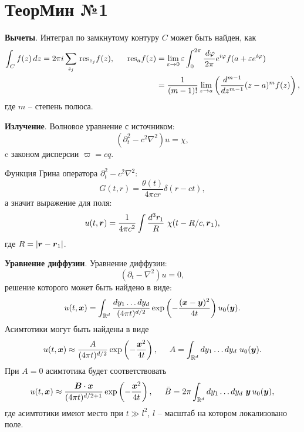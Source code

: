 \section*{ТеорМин №1}

\textbf{Вычеты}. Интеграл по замкнутому контуру $C$ может быть найден, как
\begin{align*}
    \int_C f(z) \, d z = 2 \pi i \sum_{z_j} \,\text{res}_{z_j} f(z),
    \hspace{5 mm} 
    \,\text{res}_{a} f(z) &= \lim_{\varepsilon \to 0} \varepsilon \int_0^{2\pi} \frac{\, d \varphi}{2\pi} e^{i \varphi} f(a + \varepsilon e^{i \varphi}) \\ 
    &= \frac{1}{(m-1)!} \lim_{z \to a} \left(
        \frac{d^{m-1} }{d z^{m-1}} (z-a)^m f(z)
    \right),
\end{align*}
где $m$ -- степень полюса. 

\textbf{Излучение}. Волновое уравнение с источником:
\begin{equation}
    (\partial_t^2 - c^2 \nabla^2) u = \chi,
    \label{field_eq}
\end{equation}
c законом дисперсии $\varpi = cq$. 

Функция Грина оператора $\partial_t^2 - c^2 \nabla^2$:
\begin{equation*}
    G(t, r) = \frac{\theta(t)}{4 \pi c r} \delta(r - ct),
\end{equation*}
а значит выражение для поля:
\begin{equation}
    u(t, \mbox{\boldmath $r$}) = \frac{1}{4 \pi c^2} \int \frac{d^3 r_1}{R} \ \chi(t-R/c, \mbox{\boldmath $r$}_1),
    \label{field_sol}
\end{equation}
где $R = |\mbox{\boldmath $r$} - \mbox{\boldmath $r$}_1|$. 


\textbf{Уравнение диффузии}. 
Уравнение диффузии:
\begin{equation}
    \left(\partial_t - \nabla^2\right) u = 0,
    \label{difeq}
\end{equation}
решение которого может быть найдено в виде:
\begin{equation}
    u(t, \mbox{\boldmath $x$}) = \int_{\mathbb{R}^d} \frac{d y_1 \ldots d y_d}{(4 \pi t)^{d/2}} \exp\left(- \frac{(\mbox{\boldmath $x$}-\mbox{\boldmath $y$})^2}{4 t}\right) u_0(\mbox{\boldmath $y$}).
    \label{difsol}
\end{equation}
Асимтотики могут быть найдены в виде
\begin{equation}
    u(t, \mbox{\boldmath $x$}) \approx \frac{A}{(4 \pi t)^{d/2}} \exp\left(- \frac{\mbox{\boldmath $x$}^2}{4 t}\right),
    \hspace{5 mm} 
    A = \int_{ \mathbb{R}^d} dy_1 \ldots dy_d \ u_0(\mbox{\boldmath $y$}).
    \label{difas1}
\end{equation}
При $A = 0$ асимтотика будет соответствовать
\begin{equation}
    u(t, \mbox{\boldmath $x$}) \approx  \frac{\mbox{\boldmath $B$} \cdot \mbox{\boldmath $x$}}{(4 \pi t)^{d/2+1}} \exp\left(
        - \frac{\mbox{\boldmath $x$}^2}{4 t}
    \right), \hspace{5 mm} 
    \bar{B} = 2 \pi \int_{ \mathbb{R}^d} dy_1 \ldots dy_d \ \mbox{\boldmath $y$}\, u_0(\mbox{\boldmath $y$}),
    \label{difas2}
\end{equation}
где асимтотики имеют место при $t \gg l^2$, $l$ -- масштаб на котором локализовано поле.


